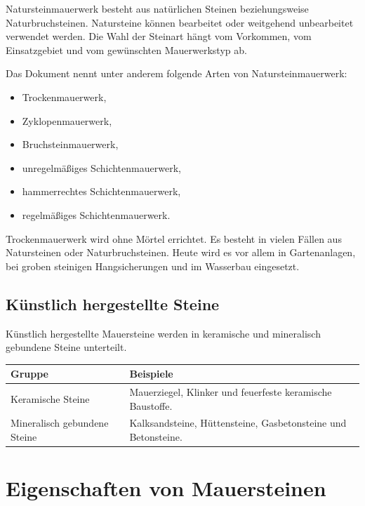\documentclass[
  12pt,
  a4paper,
  oneside
]{scrreprt}
\begin{document}
Natursteinmauerwerk besteht aus natürlichen Steinen beziehungsweise
Naturbruchsteinen. Natursteine können bearbeitet oder weitgehend
unbearbeitet verwendet werden. Die Wahl der Steinart hängt vom
Vorkommen, vom Einsatzgebiet und vom gewünschten Mauerwerkstyp ab.


Das Dokument nennt unter anderem folgende Arten von
Natursteinmauerwerk:

\begin{itemize}
  \item Trockenmauerwerk,
  \item Zyklopenmauerwerk,
  \item Bruchsteinmauerwerk,
  \item unregelmäßiges Schichtenmauerwerk,
  \item hammerrechtes Schichtenmauerwerk,
  \item regelmäßiges Schichtenmauerwerk.
\end{itemize}



Trockenmauerwerk wird ohne Mörtel errichtet. Es besteht in vielen Fällen
aus Natursteinen oder Naturbruchsteinen. Heute wird es vor allem in
Gartenanlagen, bei groben steinigen Hangsicherungen und im Wasserbau
eingesetzt.


\subsection{Künstlich hergestellte Steine}

Künstlich hergestellte Mauersteine werden in keramische und mineralisch
gebundene Steine unterteilt.

\begin{longtable}{
  >{\raggedright\arraybackslash}p{}
  >{\raggedright\arraybackslash}p{}
}
\toprule
\textbf{Gruppe} &
\textbf{Beispiele} \\
\midrule
\endhead

Keramische Steine &
Mauerziegel, Klinker und feuerfeste keramische Baustoffe. \\

Mineralisch gebundene Steine &
Kalksandsteine, Hüttensteine, Gasbetonsteine und Betonsteine. \\

\bottomrule
\end{longtable}



\section{Eigenschaften von Mauersteinen}
\end{document}
